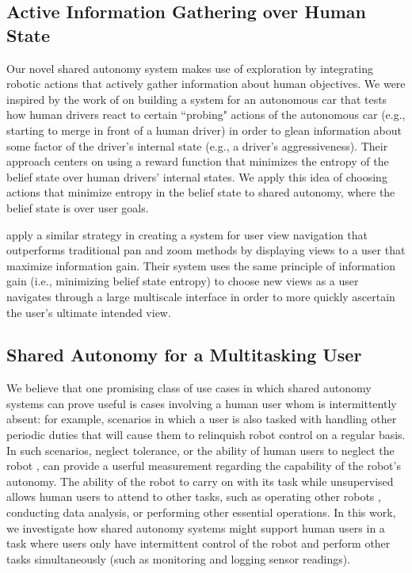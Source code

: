 \documentclass[conference]{IEEEtran}
\begin{document}
\subsection{Active Information Gathering over Human State}
Our novel shared autonomy system makes use of exploration by integrating robotic actions that actively gather information about human objectives. We were inspired by the work of \citet{sadigh2016information} on building a system for an autonomous car that tests how human drivers react to certain ``probing" actions of the autonomous car (e.g., starting to merge in front of a human driver) in order to glean information about some factor of the driver's internal state (e.g., a driver's aggressiveness). Their approach centers on using a reward function that minimizes the entropy of the belief state over human drivers' internal states. We apply this idea of choosing actions that minimize entropy in the belief state to shared autonomy, where the belief state is over user goals.

\citet{liu2017bignav} apply a similar strategy in creating a system for user view navigation that outperforms traditional pan and zoom methods by displaying views to a user that maximize information gain. Their system uses the same principle of information gain (i.e., minimizing belief state entropy) to choose new views as a user navigates through a large multiscale interface in order to more quickly ascertain the user's ultimate intended view.

\subsection{Shared Autonomy for a Multitasking User}
We believe that one promising class of use cases in which shared autonomy systems can prove useful is cases involving a human user whom is intermittently absent: for example, scenarios in which a user is also tasked with handling other periodic duties that will cause them to relinquish robot control on a regular basis. In such scenarios, neglect tolerance, or the ability of human users to neglect the robot \cite{crandall2002characterizing, olsen2003metrics}, can provide a userful measurement regarding the capability of the robot's autonomy. The ability of the robot to carry on with its task while unsupervised allows human users to attend to other tasks, such as operating other robots \cite{crandall2005validating, cummings2008predicting}, conducting data analysis, or performing other essential operations. In this work, we investigate how shared autonomy systems might support human users in a task where users only have intermittent control of the robot and perform other tasks simultaneously (such as monitoring and logging sensor readings). 
\end{document}
